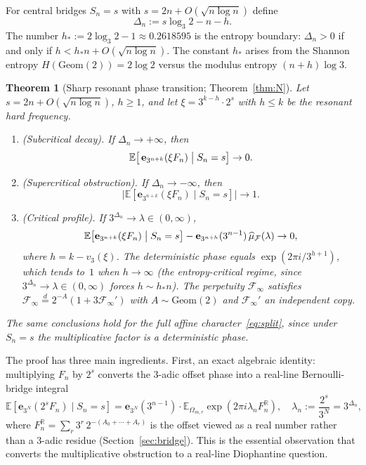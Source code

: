 \documentclass[11pt,a4paper]{amsart}
\theoremstyle{plain}
\newtheorem{theorem}{Theorem}[section]
\theoremstyle{definition}
\newcommand{\R}{\mathbb{R}}
\newcommand{\E}{\mathbb{E}}
\newcommand{\Geom}{\mathrm{Geom}}
\begin{document}
For central bridges $S_n=s$ with $s=2n+O(\sqrt{n\log n})$ define
\begin{equation}\label{eq:Delta}
\Delta_n:=s\log_3 2-n-h.
\end{equation}
The number $h_\ast:=2\log_3 2-1\approx 0.2618595$ is the entropy boundary:
$\Delta_n>0$ if and only if $h<h_\ast n+O(\sqrt{n\log n})$.
The constant $h_\ast$ arises from the Shannon entropy
$H(\Geom(2))=2\log 2$ versus the modulus entropy $(n+h)\log 3$.

\begin{theorem}[Sharp resonant phase transition; Theorem~\ref{thm:N}]
\label{thm:NIntro}
Let $s=2n+O(\sqrt{n\log n})$, $h\ge1$, and let
$\xi=3^{k-h}\cdot 2^s$ with $h\le k$ be the resonant hard frequency.
\begin{enumerate}[label=\textup{(\arabic*)}]
\item \textup{(Subcritical decay).} If $\Delta_n\to+\infty$, then
$$
\E\bigl[\,\mathbf e_{3^{n+k}}(\xi F_n)\bigm|S_n=s\bigr]\to0.
$$
\item \textup{(Supercritical obstruction).} If $\Delta_n\to-\infty$, then
$$
\bigl|\E[\mathbf e_{3^{n+k}}(\xi F_n)\mid S_n=s]\bigr|\to1.
$$
\item \textup{(Critical profile).} If $3^{\Delta_n}\to\lambda\in(0,\infty)$,
$$
\E\bigl[\mathbf e_{3^{n+k}}(\xi F_n)\bigm|S_n=s\bigr]
-\mathbf e_{3^{n+h}}(3^{n-1})\,\widehat\mu_{\mathcal F}(\lambda)\to 0,
$$
where $h=k-v_3(\xi)$.
The deterministic phase equals $\exp(2\pi i/3^{h+1})$, which tends to~$1$
when $h\to\infty$ (the entropy-critical regime, since
$3^{\Delta_n}\to\lambda\in(0,\infty)$ forces $h\sim h_\ast n$).
The perpetuity $\mathcal F_\infty$ satisfies
$\mathcal F_\infty\stackrel d=2^{-A}(1+3\mathcal F_\infty')$ with
$A\sim\Geom(2)$ and $\mathcal F_\infty'$ an independent copy.
\end{enumerate}
The same conclusions hold for the full affine character~\eqref{eq:split},
since under $S_n=s$ the multiplicative factor is a deterministic phase.
\end{theorem}

The proof has three main ingredients.
First, an exact algebraic identity: multiplying $F_n$ by $2^s$ converts
the $3$-adic offset phase into a real-line Bernoulli-bridge integral
\begin{equation}\label{eq:proofoutline-1}
\E[\mathbf e_{3^N}(2^s F_n)\mid S_n=s]
=\mathbf e_{3^N}(3^{n-1})\cdot\E_{\Omega_{m,r}}\exp(2\pi i\lambda_n F_n^{\R}),
\quad\lambda_n:=\frac{2^s}{3^N}=3^{\Delta_n},
\end{equation}
where $F_n^{\R}=\sum_r 3^r\,2^{-(A_0+\cdots+A_r)}$ is the offset viewed as
a real number rather than a $3$-adic residue (Section~\ref{sec:bridge}).
This is the essential observation that converts the multiplicative
obstruction to a real-line Diophantine question.
\end{document}

